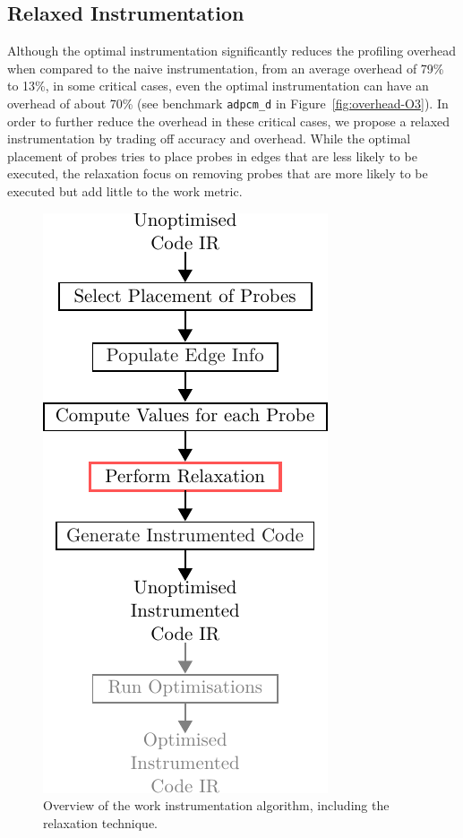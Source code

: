 \documentclass[sigplan,10pt]{acmart}
\theoremstyle{definition}
\begin{document}
\subsection{Relaxed Instrumentation}

Although the optimal instrumentation significantly reduces the profiling overhead when compared to the naive instrumentation, from an average overhead of 79\% to 13\%, in some critical cases, even the optimal instrumentation can have an overhead of about 70\% (see benchmark \texttt{adpcm\_d} in Figure~\ref{fig:overhead-O3}).
In order to further reduce the overhead in these critical cases, we propose a relaxed instrumentation by trading off accuracy and overhead.
While the optimal placement of probes tries to place probes in edges that are less likely to be executed, the relaxation focus on removing probes that are more likely to be executed but add little to the work metric.

\begin{figure}[h]
  \centering
  \includegraphics[scale=0.9]{figs/relax-instr-diagram.pdf}
  \caption{Overview of the work instrumentation algorithm, including the relaxation technique.}
  \label{fig:relax-instr-diagram}
\end{figure}
\end{document}
